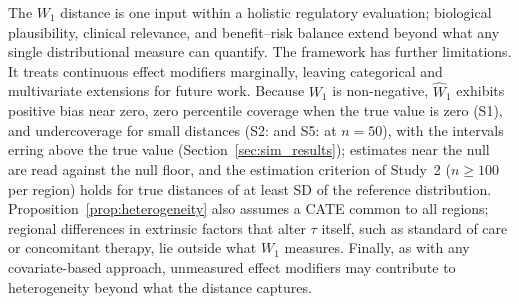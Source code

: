 \documentclass[AMA,Times1COL]{WileyNJDv5}
\begin{document}
The $W_1$ distance is one input within a holistic regulatory evaluation; biological plausibility, clinical relevance, and benefit--risk balance extend beyond what any single distributional measure can quantify.\cite{iche17,matsushima2024} The framework has further limitations. It treats continuous effect modifiers marginally, leaving categorical and multivariate extensions for future work. Because $W_1$ is non-negative, $\widehat{W}_1$ exhibits positive bias near zero, zero percentile coverage when the true value is zero (S1), and undercoverage for small distances (S2:  and S5:  at $n = 50$), with the intervals erring above the true value (Section~\ref{sec:sim_results});\cite{andrews2000} estimates near the null are read against the null floor, and the estimation criterion of Study~2 ($n \geq 100$ per region) holds for true distances of at least  SD of the reference distribution. Proposition~\ref{prop:heterogeneity} also assumes a CATE common to all regions; regional differences in extrinsic factors that alter $\tau$ itself, such as standard of care or concomitant therapy, lie outside what $W_1$ measures. Finally, as with any covariate-based approach, unmeasured effect modifiers may contribute to heterogeneity beyond what the distance captures.
\end{document}
